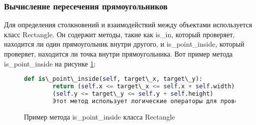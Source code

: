 \subsubsection{Вычисление пересечения прямоугольников}
Для определения столкновений и взаимодействий между объектами используется класс Rectangle. Он содержит методы, такие как is\_in, который проверяет, находится ли один прямоугольник внутри другого, и is\_point\_inside, который проверяет, находится ли точка внутри прямоугольника. Вот пример метода is\_point\_inside на рисунке \ref{tttk:image}:
\begin{figure}[H]
	\begin{lstlisting}[language=Python]
		def is\_point\_inside(self, target\_x, target\_y):
		return (self.x <= target\_x <= self.x + self.width) and
		(self.y <= target\_y <= self.y + self.height)
		Этот метод использует логические операторы для проверки, находится ли точка (target\_x, target\_y) в пределах прямоугольника, определенного координатами (x, y) и размерами (width, height).
\end{lstlisting}  
\caption{Пример метода is\_point\_inside класса Rectangle}
\label{tttk:image}
\end{figure}

